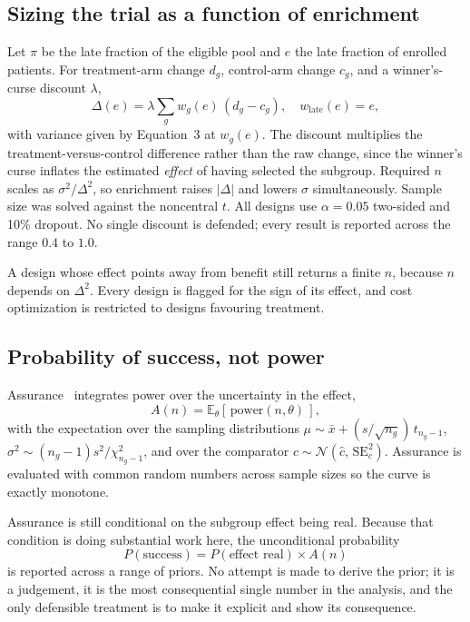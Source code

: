 \documentclass[10pt,twocolumn,letterpaper]{article}
\begin{document}
\subsection{Sizing the trial as a function of enrichment}

Let $\pi$ be the late fraction of the eligible pool and $e$ the late fraction of enrolled patients.
For treatment-arm change $d_g$, control-arm change $c_g$, and a winner's-curse discount $\lambda$,
\begin{equation}
\Delta(e) = \lambda \textstyle\sum_g w_g(e)\,(d_g - c_g), \quad w_{\text{late}}(e)=e,
\end{equation}
with variance given by Equation~3 at $w_g(e)$. The discount multiplies the treatment-versus-control
difference rather than the raw change, since the winner's curse inflates the estimated \emph{effect}
of having selected the subgroup. Required $n$ scales as $\sigma^2/\Delta^2$, so enrichment raises
$|\Delta|$ and lowers $\sigma$ simultaneously. Sample size was solved against the noncentral $t$.
All designs use $\alpha=0.05$ two-sided and 10\% dropout. No single discount is defended; every
result is reported across the range $0.4$ to $1.0$.

A design whose effect points away from benefit still returns a finite $n$, because $n$ depends on
$\Delta^2$. Every design is flagged for the sign of its effect, and cost optimization is restricted
to designs favouring treatment.

\subsection{Probability of success, not power}

Assurance~\cite{ohagan2005} integrates power over the uncertainty in the effect,
\begin{equation}
A(n) = \mathbb{E}_{\theta}\!\left[\,\mathrm{power}(n,\theta)\,\right],
\end{equation}
with the expectation over the sampling distributions
$\mu\sim\bar{x}+(s/\sqrt{n_g})\,t_{n_g-1}$, $\sigma^2\sim(n_g-1)s^2/\chi^2_{n_g-1}$, and over the
comparator $c\sim\mathcal{N}(\hat{c},\,\mathrm{SE}_c^2)$. Assurance is evaluated with common random
numbers across sample sizes so the curve is exactly monotone.

Assurance is still conditional on the subgroup effect being real. Because that condition is doing
substantial work here, the unconditional probability
\begin{equation}
P(\text{success}) = P(\text{effect real}) \times A(n)
\end{equation}
is reported across a range of priors. No attempt is made to derive the prior; it is a judgement, it
is the most consequential single number in the analysis, and the only defensible treatment is to
make it explicit and show its consequence.
\end{document}
